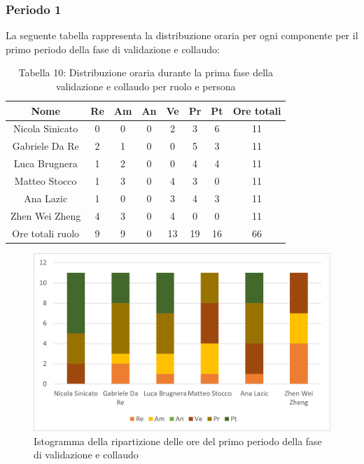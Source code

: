 \subsubsection{Periodo 1}
%
La seguente tabella rappresenta la distribuzione oraria per ogni componente per il primo periodo della fase di validazione e collaudo:
\begin{table}[h]
	\setlength\extrarowheight{5pt}
	\centering
	\begin{tabularx}{\textwidth}{|ccccccc|c|}
		\hline
		\rowcolor{white}
		\textbf{Nome} & \textbf{Re} & \textbf{Am} & \textbf{An} & \textbf{Ve} & \textbf{Pr}& \textbf{Pt} & \textbf{Ore totali} \\
		\hline
		Nicola Sinicato &0&0&0&2&3&6&11 \\
		Gabriele Da Re &2&1&0&0&5&3&11 \\
		Luca Brugnera &1&2&0&0&4&4&11 \\
		Matteo Stocco &1&3&0&4&3&0&11 \\
		Ana Lazic &1&0&0&3&4&3&11 \\
		Zhen Wei Zheng &4&3&0&4&0&0&11 \\
		\hline
		Ore totali ruolo &9&9&0&13&19&16&66 \\
		\hline
	\end{tabularx}
	\vspace{10pt}
	\caption{Tabella 10: Distribuzione oraria durante la prima fase della validazione e collaudo per ruolo e persona}
\end{table}
\begin{figure}[H]
    \centering
    \includegraphics[scale=0.6]{img/grafi preventivo/istogrammi/validazione/periodo1.png}
    \caption{Istogramma della ripartizione delle ore del primo periodo della fase di validazione e collaudo}
\end{figure}
